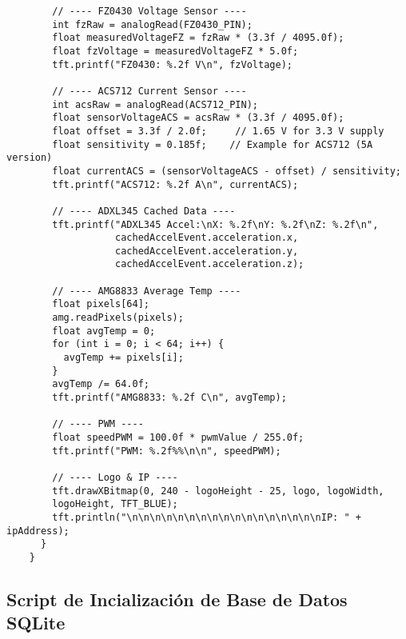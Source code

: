 \begin{verbatim}
        // ---- FZ0430 Voltage Sensor ----
        int fzRaw = analogRead(FZ0430_PIN);
        float measuredVoltageFZ = fzRaw * (3.3f / 4095.0f);
        float fzVoltage = measuredVoltageFZ * 5.0f;
        tft.printf("FZ0430: %.2f V\n", fzVoltage);
    
        // ---- ACS712 Current Sensor ----
        int acsRaw = analogRead(ACS712_PIN);
        float sensorVoltageACS = acsRaw * (3.3f / 4095.0f);
        float offset = 3.3f / 2.0f;     // 1.65 V for 3.3 V supply
        float sensitivity = 0.185f;    // Example for ACS712 (5A version)
        float currentACS = (sensorVoltageACS - offset) / sensitivity;
        tft.printf("ACS712: %.2f A\n", currentACS);
    
        // ---- ADXL345 Cached Data ----
        tft.printf("ADXL345 Accel:\nX: %.2f\nY: %.2f\nZ: %.2f\n",
                   cachedAccelEvent.acceleration.x,
                   cachedAccelEvent.acceleration.y,
                   cachedAccelEvent.acceleration.z);
    
        // ---- AMG8833 Average Temp ----
        float pixels[64];
        amg.readPixels(pixels);
        float avgTemp = 0;
        for (int i = 0; i < 64; i++) {
          avgTemp += pixels[i];
        }
        avgTemp /= 64.0f;
        tft.printf("AMG8833: %.2f C\n", avgTemp);
    
        // ---- PWM ----
        float speedPWM = 100.0f * pwmValue / 255.0f;
        tft.printf("PWM: %.2f%%\n\n", speedPWM);
    
        // ---- Logo & IP ----
        tft.drawXBitmap(0, 240 - logoHeight - 25, logo, logoWidth, 
        logoHeight, TFT_BLUE);
        tft.println("\n\n\n\n\n\n\n\n\n\n\n\n\n\n\n\n\nIP: " + ipAddress);
      }
    }    
\end{verbatim}

\subsection{Script de Incialización de Base de Datos SQLite}

